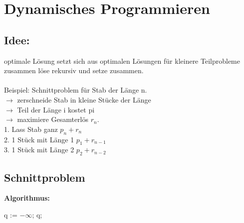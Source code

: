 %

\chapter{Dynamisches Programmieren} 			

\section{Idee:} optimale Lösung setzt sich aus optimalen Lösungen für kleinere Teilprobleme zusammen löse rekursiv und setze zusammen.\\
\ \\
Beispiel: Schnittproblem für Stab der Länge n.\\
$\rightarrow$ zerschneide Stab in kleine Stücke der Länge\\
$\rightarrow$ Teil der Länge i kostet pi\\
$\rightarrow$ maximiere Gesamterlös $r_n$.\\
1. Lass Stab ganz  	   $p_n + r_n$\\
2. 1 Stück mit Länge 1  $p_1 + r_{n-1}$\\
3. 1 Stück mit Länge 2  $p_2 + r_{n-2}$\\

\section{Schnittproblem}
\textbf{Algorithmus:}

\begin{algorithmic}[1]
\State q := $- \infty$;
\EndIf
{} 
\EndFor
\Return q;
\EndFunction 
\end{algorithmic}


